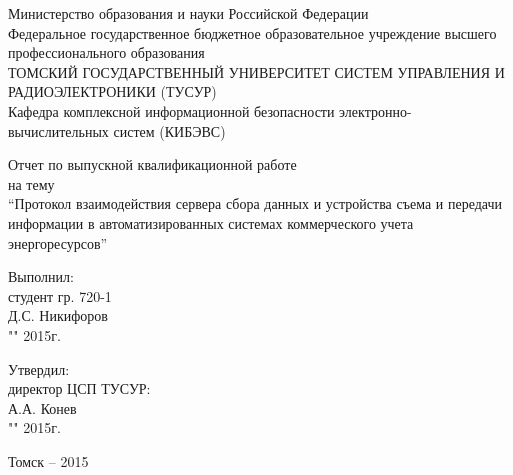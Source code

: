 \newpage
{}

\begin{center}
Министерство образования и науки Российской Федерации\\
Федеральное государственное бюджетное образовательное учреждение высшего профессионального образования\\
ТОМСКИЙ ГОСУДАРСТВЕННЫЙ УНИВЕРСИТЕТ СИСТЕМ УПРАВЛЕНИЯ И РАДИОЭЛЕКТРОНИКИ (ТУСУР)\\
Кафедра комплексной информационной безопасности электронно-вычислительных систем (КИБЭВС)\\
\end{center}

\vspace{2cm}

\begin{center}
Отчет по выпускной квалификационной работе \\
на тему \\
``Протокол взаимодействия сервера сбора данных и устройства съема и передачи информации в автоматизированных системах коммерческого учета энергоресурсов''
\end{center}

\vspace{2cm}

\begin{flushright}
Выполнил: \\
студент гр. 720-1 \\
\underline{\hspace{2.5cm}}Д.С. Никифоров \\
"\underline{\hspace{1cm}}"\underline{\hspace{3cm}} 2015г.\\
\end{flushright}

\begin{flushright}
Утвердил: \\
директор ЦСП ТУСУР: \\
\underline{\hspace{2.5cm}}А.А. Конев \\
"\underline{\hspace{1cm}}"\underline{\hspace{3cm}} 2015г.\\
\end{flushright}

\vfill
\begin{center}
Томск -- 2015
\end{center}